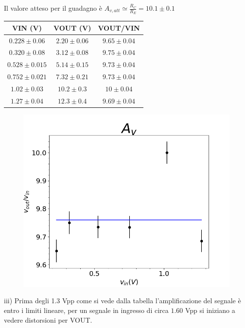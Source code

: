 \documentclass[10pt,a4paper]{article}
\begin{document}
Il valore atteso per il guadagno è $A_{v,att} \simeq \frac{R_C}{R_E}= 10.1\pm 0.1$
\begin{table}[h]
	\centering
	\begin{tabular}{|c|c|c|}
		\hline 
		 VIN (\si{\volt}) &  VOUT (\si{\volt})   & VOUT/VIN\\
		\hline 
	$0.228 \pm  0.06 $& $2.20\pm 0.06$& $9.65 \pm 0.04$\\
	$0.320\pm 0.08 $& $3.12 \pm 0.08$& $9.75 \pm0.04$\\
	$0.528\pm 0.015 $& $5.14 \pm 0.15$& $9.73\pm 0.04$ \\
	$0.752\pm 0.021$& $7.32\pm 0.21$ & $9.73\pm 0.04$\\
	$1.02\pm 0.03 $& $10.2\pm 0.3$& $10\pm 0.04 $\\
	$1.27\pm 0.04$ & $12.3\pm 0.4 $& $9.69\pm 0.04 $\\

		\hline 
	\end{tabular} 
\end{table}

\begin{figure}[h]
	\centering
	\includegraphics[scale=0.45]{guadagno.png}

	
	
\end{figure}

iii) Prima degli 1.3 \si{\volt}pp come si vede dalla tabella l'amplificazione del segnale è entro i limiti lineare,  per un segnale in ingresso di circa $1.60$ \si{\volt}pp si iniziano a vedere distorsioni per VOUT.
 
\end{document}
